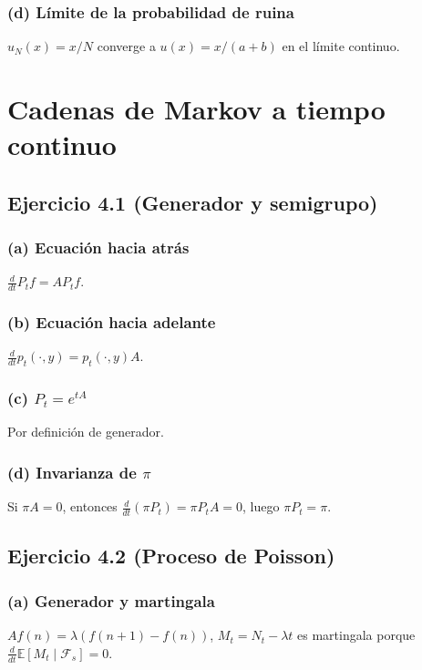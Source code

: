 \documentclass[letterpaper, 12pt]{article}
\newcommand{\E}{\mathbb{E}}
\newcommand{\F}{\mathcal{F}}
\newcommand{\1}{\mathbbm{1}}
\begin{document}
    \subsubsection*{(d) L\'imite de la probabilidad de ruina}
    $u_N(x)=x/N$ converge a $u(x)=x/(a+b)$ en el l\'imite continuo.

    \section{Cadenas de Markov a tiempo continuo}

    \subsection{Ejercicio 4.1 (Generador y semigrupo)}

    \subsubsection*{(a) Ecuaci\'on hacia atr\'as}
    $\frac{d}{dt}P_tf = A P_t f$.

    \subsubsection*{(b) Ecuaci\'on hacia adelante}
    $\frac{d}{dt}p_t(\cdot,y)=p_t(\cdot,y)A$.

    \subsubsection*{(c) $P_t=e^{tA}$}
    Por definici\'on de generador.

    \subsubsection*{(d) Invarianza de $\pi$}
    Si $\pi A=0$, entonces $\frac{d}{dt}(\pi P_t)=\pi P_t A=0$, luego $\pi P_t=\pi$.

    \subsection{Ejercicio 4.2 (Proceso de Poisson)}

    \subsubsection*{(a) Generador y martingala}
    $Af(n)=\lambda(f(n+1)-f(n))$, $M_t=N_t-\lambda t$ es martingala porque $\frac{d}{dt}\E[M_t\mid\F_s]=0$.
\end{document}
